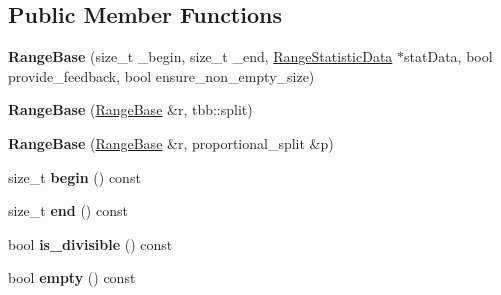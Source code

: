 \subsection*{Public Member Functions}
\begin{DoxyCompactItemize}
\item 
\hypertarget{classtest__partitioner__utils_1_1RangeBase_a45572a4289fb16a1f1e431ebcf781550}{}{\bfseries Range\+Base} (size\+\_\+t \+\_\+begin, size\+\_\+t \+\_\+end, \hyperlink{structtest__partitioner__utils_1_1RangeStatisticData}{Range\+Statistic\+Data} $\ast$stat\+Data, bool provide\+\_\+feedback, bool ensure\+\_\+non\+\_\+empty\+\_\+size)\label{classtest__partitioner__utils_1_1RangeBase_a45572a4289fb16a1f1e431ebcf781550}

\item 
\hypertarget{classtest__partitioner__utils_1_1RangeBase_a61193d1f52355eb92d73fc259ecf65e3}{}{\bfseries Range\+Base} (\hyperlink{classtest__partitioner__utils_1_1RangeBase}{Range\+Base} \&r, tbb\+::split)\label{classtest__partitioner__utils_1_1RangeBase_a61193d1f52355eb92d73fc259ecf65e3}

\item 
\hypertarget{classtest__partitioner__utils_1_1RangeBase_a383f2189d2c4fc3507c6921abf2eb7ce}{}{\bfseries Range\+Base} (\hyperlink{classtest__partitioner__utils_1_1RangeBase}{Range\+Base} \&r, proportional\+\_\+split \&p)\label{classtest__partitioner__utils_1_1RangeBase_a383f2189d2c4fc3507c6921abf2eb7ce}

\item 
\hypertarget{classtest__partitioner__utils_1_1RangeBase_a5f800da104be1e8ebe979fc3befe67f5}{}size\+\_\+t {\bfseries begin} () const \label{classtest__partitioner__utils_1_1RangeBase_a5f800da104be1e8ebe979fc3befe67f5}

\item 
\hypertarget{classtest__partitioner__utils_1_1RangeBase_a5a1ae4a13595c13580ed6de578a2c51e}{}size\+\_\+t {\bfseries end} () const \label{classtest__partitioner__utils_1_1RangeBase_a5a1ae4a13595c13580ed6de578a2c51e}

\item 
\hypertarget{classtest__partitioner__utils_1_1RangeBase_abda9f9ebc951f35857e18bcc62b96215}{}bool {\bfseries is\+\_\+divisible} () const \label{classtest__partitioner__utils_1_1RangeBase_abda9f9ebc951f35857e18bcc62b96215}

\item 
\hypertarget{classtest__partitioner__utils_1_1RangeBase_accebc878c75ce151b683e12301a94d56}{}bool {\bfseries empty} () const \label{classtest__partitioner__utils_1_1RangeBase_accebc878c75ce151b683e12301a94d56}


\end{DoxyCompactItemize}
